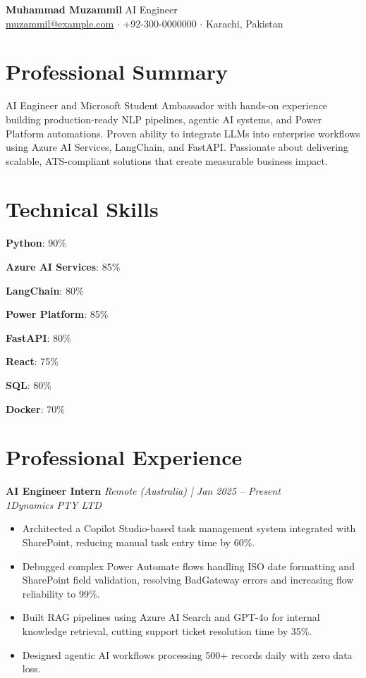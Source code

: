 \documentclass[10pt,a4paper]{article}
\newcommand{\simpleheader}[5]{%
  {\LARGE\textbf{#1}} \hfill {\large #2} \\[2pt]
  \href{mailto:#3}{#3} $\cdot$ #4 $\cdot$ #5
  \vspace{4pt}
}
\newcommand{\cvevent}[4]{%
  \textbf{#1} \hfill \textit{#3 | #4} \\
  \textit{#2}
}
\newcommand{\barrule}[2]{%
  \textbf{#1}: #2\% \quad
}
\begin{document}
\simpleheader{Muhammad Muzammil}{AI Engineer}{muzammil@example.com}{+92-300-0000000}{Karachi, Pakistan}

\section{Professional Summary}
AI Engineer and Microsoft Student Ambassador with hands-on experience building
production-ready NLP pipelines, agentic AI systems, and Power Platform automations.
Proven ability to integrate LLMs into enterprise workflows using Azure AI Services,
LangChain, and FastAPI. Passionate about delivering scalable, ATS-compliant solutions
that create measurable business impact.

\section{Technical Skills}
\barrule{Python}{90}
\barrule{Azure AI Services}{85}
\barrule{LangChain}{80}
\barrule{Power Platform}{85}
\barrule{FastAPI}{80}
\barrule{React}{75}
\barrule{SQL}{80}
\barrule{Docker}{70}

\section{Professional Experience}

\cvevent{AI Engineer Intern}{1Dynamics PTY LTD}{Remote (Australia)}{Jan 2025 -- Present}
\begin{itemize}[leftmargin=*,noitemsep]
  \item Architected a Copilot Studio-based task management system integrated with SharePoint,
        reducing manual task entry time by 60\%.
  \item Debugged complex Power Automate flows handling ISO date formatting and SharePoint
        field validation, resolving BadGateway errors and increasing flow reliability to 99\%.
  \item Built RAG pipelines using Azure AI Search and GPT-4o for internal knowledge retrieval,
        cutting support ticket resolution time by 35\%.
  \item Designed agentic AI workflows processing 500+ records daily with zero data loss.
\end{itemize}
\end{document}
